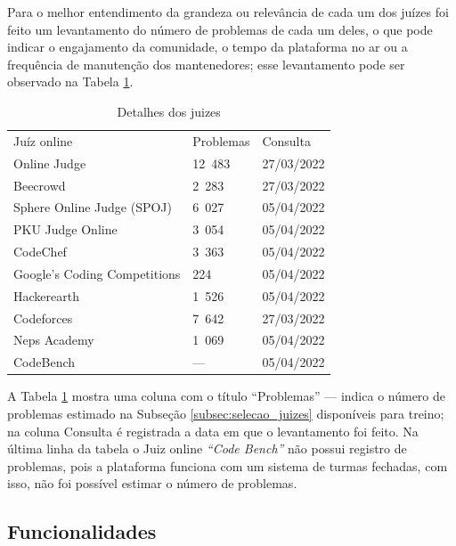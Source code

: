 Para o melhor entendimento da grandeza ou relevância de cada um dos juízes foi feito um levantamento do número de problemas de cada um deles, o que pode indicar o engajamento da comunidade, o tempo da plataforma no ar ou a frequência de manutenção dos mantenedores; esse levantamento pode ser observado na Tabela \ref{table:detalhes_juizes}. 

\begin{table}[ht]
    \caption{Detalhes dos juizes}
    \centering
    \label{table:detalhes_juizes}
\begin{tabular}{lll}
\rowcolor[HTML]{CBCEFB} 
Juíz online         & Problemas & Consulta \\
Online Judge                 & 12 483              & 27/03/2022        \\
Beecrowd                     & 2 283               & 27/03/2022        \\
Sphere Online Judge (SPOJ)   & 6 027               & 05/04/2022        \\
PKU Judge Online             & 3 054               & 05/04/2022        \\
CodeChef                     & 3 363               & 05/04/2022        \\
Google's Coding Competitions & 224                & 05/04/2022        \\
Hackerearth                  & 1 526               & 05/04/2022        \\
Codeforces                   & 7 642               & 27/03/2022        \\
Neps Academy                 & 1 069               & 05/04/2022        \\
CodeBench                    & —                  & 05/04/2022       
\end{tabular}
\end{table}

A Tabela \ref{table:detalhes_juizes} mostra uma coluna com o título “Problemas” — indica o número de problemas estimado na Subseção \ref{subsec:selecao_juizes} disponíveis para treino; na coluna Consulta é registrada a data em que o levantamento foi feito. Na última linha da tabela o Juiz online \textit{“Code Bench”} não possui registro de problemas, pois a plataforma funciona com um sistema de turmas fechadas, com isso, não foi possível estimar o número de problemas.

\subsection{Funcionalidades}
\label{subsec:funcionalidades}

